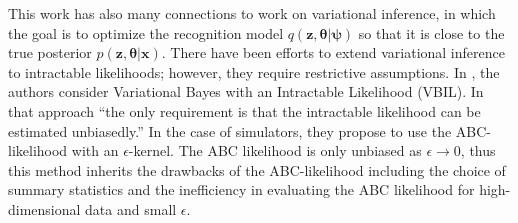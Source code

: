 \documentclass[twocolumn,superscriptaddress,aps]{revtex4-1}
\newcommand{\kcnote}[1]{\textcolor{red}{[KC: #1]}}
\newcommand{\bftheta}{{\bm \theta}}
\newcommand{\bfpsi}{{\bm \psi}}
\newcommand{\bfx}{\mathbf{x}}
\newcommand{\bfz}{\mathbf{z}}
\theoremstyle{plain}
\begin{document}
This work has also many connections to work on variational inference, in which the
goal is to optimize the recognition model $q(\bfz, \bftheta|\bfpsi)$ so that it
is close to the true posterior $p(\bfz, \bftheta |\mathbf{x})$. There have been efforts
to extend variational inference to intractable likelihoods; however, they
require restrictive assumptions.  In \citep{tran2017variational}, the authors
consider Variational Bayes with an Intractable Likelihood (VBIL). In that
approach ``the only requirement is that the intractable likelihood can be
estimated unbiasedly.'' In the case of simulators, they propose to use the
ABC-likelihood with an $\epsilon$-kernel. The ABC likelihood is only unbiased as
$\epsilon \to 0$,   thus this method inherits the drawbacks of the ABC-likelihood
including the choice of summary statistics and the inefficiency in evaluating
the ABC likelihood for high-dimensional data and small $\epsilon$.







\end{document}
